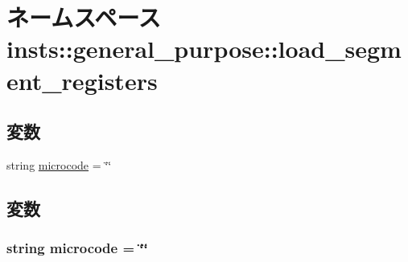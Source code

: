 \hypertarget{namespaceinsts_1_1general__purpose_1_1load__segment__registers}{
\section{ネームスペース insts::general\_\-purpose::load\_\-segment\_\-registers}
\label{namespaceinsts_1_1general__purpose_1_1load__segment__registers}
}
\subsection*{変数}
\begin{DoxyCompactItemize}
\item 
string \hyperlink{namespaceinsts_1_1general__purpose_1_1load__segment__registers_a770f11a173e99389a8802f0107ed8f52}{microcode} = \char`\"{}\char`\"{}
\end{DoxyCompactItemize}


\subsection{変数}
\hypertarget{namespaceinsts_1_1general__purpose_1_1load__segment__registers_a770f11a173e99389a8802f0107ed8f52}{
\subsubsection[{microcode}]{\setlength{\rightskip}{0pt plus 5cm}string {\bf microcode} = \char`\"{}\char`\"{}}}
\label{namespaceinsts_1_1general__purpose_1_1load__segment__registers_a770f11a173e99389a8802f0107ed8f52}
